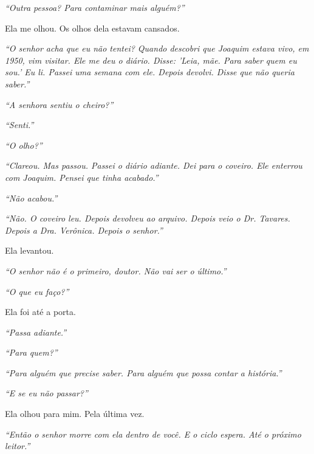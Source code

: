 \noindent \textit{\textquotedblleft{}Outra pessoa? Para contaminar mais alguém?\textquotedblright{}}

\noindent Ela me olhou. Os olhos dela estavam cansados.

\noindent \textit{\textquotedblleft{}O senhor acha que eu não tentei? Quando descobri que Joaquim estava vivo, em 1950, vim visitar. Ele me deu o diário. Disse: 'Leia, mãe. Para saber quem eu sou.' Eu li. Passei uma semana com ele. Depois devolvi. Disse que não queria saber.\textquotedblright{}}

\noindent \textit{\textquotedblleft{}A senhora sentiu o cheiro?\textquotedblright{}}

\noindent \textit{\textquotedblleft{}Senti.\textquotedblright{}}

\noindent \textit{\textquotedblleft{}O olho?\textquotedblright{}}

\noindent \textit{\textquotedblleft{}Clareou. Mas passou. Passei o diário adiante. Dei para o coveiro. Ele enterrou com Joaquim. Pensei que tinha acabado.\textquotedblright{}}

\noindent \textit{\textquotedblleft{}Não acabou.\textquotedblright{}}

\noindent \textit{\textquotedblleft{}Não. O coveiro leu. Depois devolveu ao arquivo. Depois veio o Dr. Tavares. Depois a Dra. Verônica. Depois o senhor.\textquotedblright{}}

\noindent Ela levantou.

\noindent \textit{\textquotedblleft{}O senhor não é o primeiro, doutor. Não vai ser o último.\textquotedblright{}}

\noindent \textit{\textquotedblleft{}O que eu faço?\textquotedblright{}}

\noindent Ela foi até a porta.

\noindent \textit{\textquotedblleft{}Passa adiante.\textquotedblright{}}

\noindent \textit{\textquotedblleft{}Para quem?\textquotedblright{}}

\noindent \textit{\textquotedblleft{}Para alguém que precise saber. Para alguém que possa contar a história.\textquotedblright{}}

\noindent \textit{\textquotedblleft{}E se eu não passar?\textquotedblright{}}

\noindent Ela olhou para mim. Pela última vez.

\noindent \textit{\textquotedblleft{}Então o senhor morre com ela dentro de você. E o ciclo espera. Até o próximo leitor.\textquotedblright{}}

